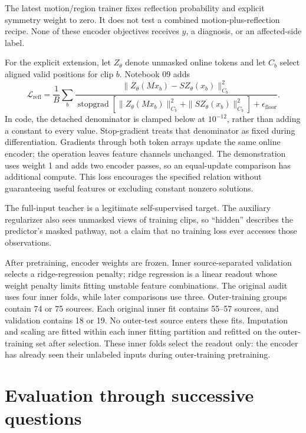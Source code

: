 \documentclass{article}
\begin{document}
The latest motion/region trainer fixes reflection probability and explicit symmetry weight to zero. It does not test a combined motion-plus-reflection recipe. None of these encoder objectives receives \(y\), a diagnosis, or an affected-side label.

For the explicit extension, let \(Z_\theta\) denote unmasked online tokens and let \(C_b\) select aligned valid positions for clip \(b\). Notebook 09 adds \[
\mathcal L_{\mathrm{refl}}=\frac{1}{B}\sum_b
\frac{\|Z_\theta(Mx_b)-S Z_\theta(x_b)\|_{C_b}^2}
{\operatorname{stopgrad}\!\left[
\|Z_\theta(Mx_b)\|_{C_b}^2+\|S Z_\theta(x_b)\|_{C_b}^2
\right]+\epsilon_{\mathrm{floor}}}.
\] In code, the detached denominator is clamped below at \(10^{-12}\), rather than adding a constant to every value. Stop-gradient treats that denominator as fixed during differentiation. Gradients through both token arrays update the same online encoder; the operation leaves feature channels unchanged. The demonstration uses weight 1 and adds two encoder passes, so an equal-update comparison has additional compute. This loss encourages the specified relation without guaranteeing useful features or excluding constant nonzero solutions.

The full-input teacher is a legitimate self-supervised target. The auxiliary regularizer also sees unmasked views of training clips, so ``hidden'' describes the predictor's masked pathway, not a claim that no training loss ever accesses those observations.

After pretraining, encoder weights are frozen. Inner source-separated validation selects a ridge-regression penalty; ridge regression is a linear readout whose weight penalty limits fitting unstable feature combinations. The original audit uses four inner folds, while later comparisons use three. Outer-training groups contain 74 or 75 sources. Each original inner fit contains 55--57 sources, and validation contains 18 or 19. No outer-test source enters these fits. Imputation and scaling are fitted within each inner fitting partition and refitted on the outer-training set after selection. These inner folds select the readout only: the encoder has already seen their unlabeled inputs during outer-training pretraining.

\section{Evaluation through successive questions}\label{evaluation-through-successive-questions}
\end{document}
